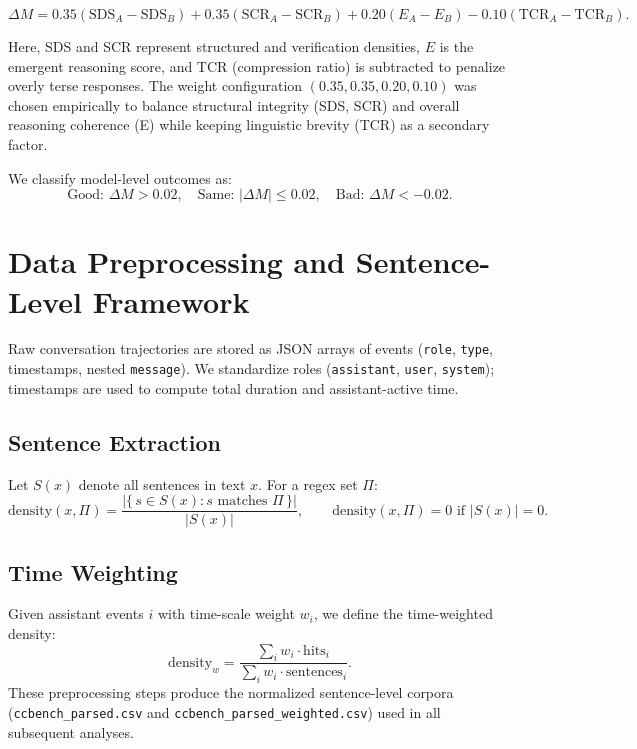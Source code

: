 \documentclass[11pt]{article}
\newcommand{\density}{\mathrm{density}}
\newcommand{\densityw}{\mathrm{density}_{w}}
\newcommand{\sentset}{S}
\begin{document}
\[
\Delta M =
0.35(\mathrm{SDS}_A - \mathrm{SDS}_B)
+ 0.35(\mathrm{SCR}_A - \mathrm{SCR}_B)
+ 0.20(E_A - E_B)
- 0.10(\mathrm{TCR}_A - \mathrm{TCR}_B).
\]

Here, SDS and SCR represent structured and verification densities,
$E$ is the emergent reasoning score,
and TCR (compression ratio) is subtracted to penalize overly terse responses.
The weight configuration $(0.35, 0.35, 0.20, 0.10)$
was chosen empirically to balance structural integrity (SDS, SCR)
and overall reasoning coherence (E)
while keeping linguistic brevity (TCR) as a secondary factor.

We classify model-level outcomes as:
\[
\text{Good: } \Delta M > 0.02, \quad
\text{Same: } |\Delta M| \le 0.02, \quad
\text{Bad: } \Delta M < -0.02.
\]

\section{Data Preprocessing and Sentence-Level Framework}
\label{appendix:data-preprocessing}

Raw conversation trajectories are stored as JSON arrays of events (\texttt{role}, \texttt{type}, timestamps, nested \texttt{message}).
We standardize roles (\texttt{assistant}, \texttt{user}, \texttt{system}); timestamps are used to compute total duration and assistant-active time.

\subsection{Sentence Extraction}
Let $\sentset(x)$ denote all sentences in text $x$. For a regex set $\Pi$:
\[
\density(x,\Pi) = \frac{\bigl|\{\,s\in\sentset(x): s \text{ matches } \Pi\,\}\bigr|}{|\sentset(x)|}, 
\qquad
\density(x,\Pi)=0 \text{ if } |\sentset(x)|=0.
\]

\subsection{Time Weighting}
Given assistant events $i$ with time-scale weight $w_i$, we define the time-weighted density:
\[
\densityw = \frac{\sum_i w_i \cdot \text{hits}_i}{\sum_i w_i \cdot \text{sentences}_i}.
\]
These preprocessing steps produce the normalized sentence-level corpora
(\texttt{ccbench\_parsed.csv} and \texttt{ccbench\_parsed\_weighted.csv}) used in all subsequent analyses.


% 
\end{document}
